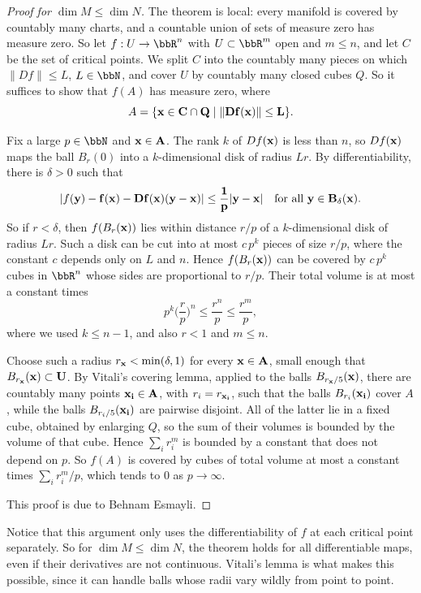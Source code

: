 \begin{proof}[Proof for $\dim M\leq\dim N$]
    The theorem is local: every manifold is covered by countably many charts, and a countable union of sets of measure zero has measure zero. So let $f:U\to\bbR^n$ with $U\subset\bbR^m$ open and $m\leq n$, and let $C$ be the set of critical points. We split $C$ into the countably many pieces on which $\lVert Df\rVert\leq L$, $L\in\bbN$, and cover $U$ by countably many closed cubes $Q$. So it suffices to show that $f(A)$ has measure zero, where
    \[A=\{\bf{x}\in C\cap Q\mid\lVert Df(\bf{x})\rVert\leq L\}.\]

    Fix a large $p\in\bbN$ and $\bf{x}\in A$. The rank $k$ of $Df(\bf{x})$ is less than $n$, so $Df(\bf{x})$ maps the ball $B_r(0)$ into a $k$-dimensional disk of radius $Lr$. By differentiability, there is $\delta>0$ such that
    \[\lvert f(\bf{y})-f(\bf{x})-Df(\bf{x})(\bf{y}-\bf{x})\rvert\leq\frac1p\lvert\bf{y}-\bf{x}\rvert\quad\text{for all }\bf{y}\in B_\delta(\bf{x}).\]
    So if $r<\delta$, then $f(B_r(\bf{x}))$ lies within distance $r/p$ of a $k$-dimensional disk of radius $Lr$. Such a disk can be cut into at most $c\,p^k$ pieces of size $r/p$, where the constant $c$ depends only on $L$ and $n$. Hence $f(B_r(\bf{x}))$ can be covered by $c\,p^k$ cubes in $\bbR^n$ whose sides are proportional to $r/p$. Their total volume is at most a constant times
    \[p^k\Big(\frac rp\Big)^n\leq\frac{r^n}{p}\leq\frac{r^m}{p},\]
    where we used $k\leq n-1$, and also $r<1$ and $m\leq n$.

    Choose such a radius $r_{\bf{x}}<\min(\delta,1)$ for every $\bf{x}\in A$, small enough that $B_{r_{\bf{x}}}(\bf{x})\subset U$. By Vitali's covering lemma, applied to the balls $B_{r_{\bf{x}}/5}(\bf{x})$, there are countably many points $\bf{x}_i\in A$, with $r_i=r_{\bf{x}_i}$, such that the balls $B_{r_i}(\bf{x}_i)$ cover $A$, while the balls $B_{r_i/5}(\bf{x}_i)$ are pairwise disjoint. All of the latter lie in a fixed cube, obtained by enlarging $Q$, so the sum of their volumes is bounded by the volume of that cube. Hence $\sum_ir_i^m$ is bounded by a constant that does not depend on $p$. So $f(A)$ is covered by cubes of total volume at most a constant times $\sum_ir_i^m/p$, which tends to $0$ as $p\to\infty$.

    This proof is due to Behnam Esmayli.
\end{proof}
Notice that this argument only uses the differentiability of $f$ at each critical point separately. So for $\dim M\leq\dim N$, the theorem holds for all differentiable maps, even if their derivatives are not continuous. Vitali's lemma is what makes this possible, since it can handle balls whose radii vary wildly from point to point.

